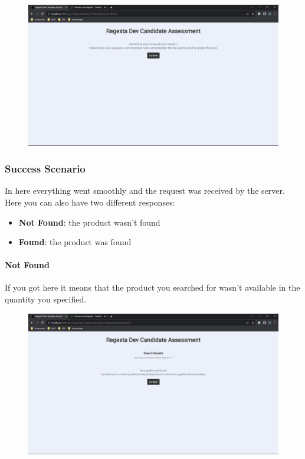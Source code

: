 \documentclass[11pt]{article}
\begin{document}
  \begin{figure}[h]
    \centering
    \includegraphics[scale=0.4433]{images/03.png}
  \end{figure}

  \subsubsection*{Success Scenario}
  In here everything went smoothly and the request was received by the server. Here you can also have two different responses: 
  \begin{itemize}
    \item \textbf{Not Found}: the product wasn't found
    \item \textbf{Found}: the product was found
  \end{itemize}
  \newpage

  \paragraph*{Not Found}
  If you got here it means that the product you searched for wasn't available in the quantity you specified.

  \begin{figure}[h]
    \centering
    \includegraphics[scale=0.4433]{images/04.png}
  \end{figure}
\end{document}
